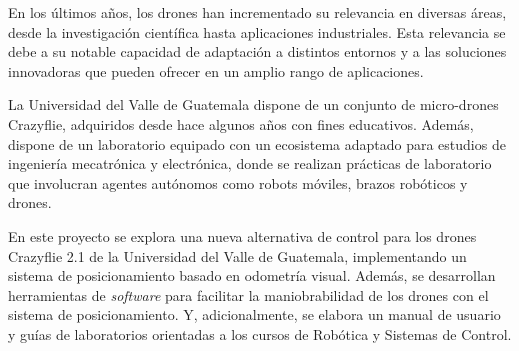 En los últimos años, los drones han incrementado su relevancia en diversas áreas, desde la investigación científica hasta aplicaciones industriales. Esta relevancia se debe a su notable capacidad de adaptación a distintos entornos y a las soluciones innovadoras que pueden ofrecer en un amplio rango de aplicaciones.

La Universidad del Valle de Guatemala dispone de un conjunto de micro-drones Crazyflie, adquiridos desde hace algunos años con fines educativos. Además, dispone de un laboratorio equipado con un ecosistema adaptado para estudios de ingeniería mecatrónica y electrónica, donde se realizan prácticas de laboratorio que involucran agentes autónomos como robots móviles, brazos robóticos y drones. 

En este proyecto se explora una nueva alternativa de control para los drones Crazyflie 2.1 de la Universidad del Valle de Guatemala, implementando un sistema de posicionamiento basado en odometría visual. Además, se desarrollan herramientas de \textit{software} para facilitar la maniobrabilidad de los drones con el sistema de posicionamiento. Y, adicionalmente, se elabora un manual de usuario y guías de laboratorios orientadas a los cursos de Robótica y Sistemas de Control.